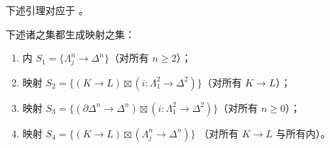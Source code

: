 下述引理对应于 \cite[Proposition 2.3.2.1]{Lur09}。

\begin{lemma}\label{lem:inner-box-generators}
下述诸\trMorphism{}之集都生成\trInnerAnodyne{}映射之集：
\begin{enumerate}[label=(\arabic*)]
  \item 内\trHornInclusion{} $S_1 = \{\Lambda^n_j \to \Delta^n\}$（对所有
  $n \ge 2$）；
  \item 映射 $S_2 = \{(K \to L) \boxtimes (i\colon \Lambda^2_1 \to \Delta^2)\}$（对所有\trMonomorphism{} $K \to L$）；
  \item 映射 $S_3 = \{(\partial\Delta^n \to \Delta^n) \boxtimes (i\colon \Lambda^2_1 \to \Delta^2)\}$（对所有 $n \ge 0$）；
  \item 映射 $S_4 = \{(K \to L) \boxtimes (\Lambda^n_j \to \Delta^n)\}$
  （对所有\trMonomorphism{} $K \to L$ 与所有内\trHorn{}）。
\end{enumerate}
\end{lemma}

